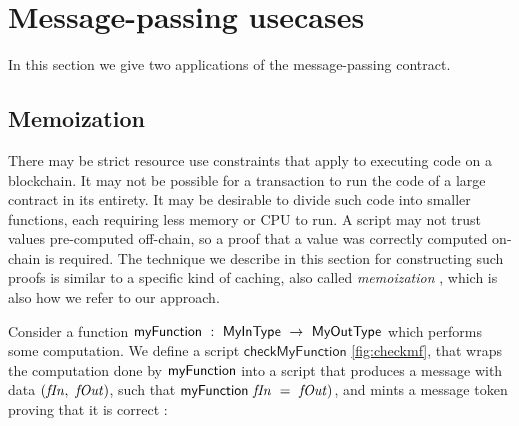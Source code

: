 
\section{Message-passing usecases}
\label{sec:usecases}

In this section we give two applications of the message-passing contract.

\subsection{Memoization}
\label{sec:partial}

There may be strict resource use constraints that apply to executing code on a
blockchain. It may not be possible for a transaction to run the code of a large contract in its
entirety. It may be desirable to divide such code into smaller functions, each requiring
less memory or CPU to run. A script may not trust values pre-computed off-chain,
so a proof that a value was correctly computed on-chain is required.
The technique we describe in this section for constructing such proofs is
similar to a specific kind of caching, also called \emph{memoization} \cite{memoization},
which is also how we refer to our approach.

Consider a function $\mathsf{myFunction}~:~\mathsf{MyInType}~\to~ \mathsf{MyOutType}$
which performs some computation. We define a script $\mathsf{checkMyFunction}$ \ref{fig:checkmf},
that wraps the computation
done by $\mathsf{myFunction}$ into a script that produces a message with
data $(\mathit{fIn},~\mathit{fOut})$, such that $\mathsf{myFunction}~\mathit{fIn}~=~\mathit{fOut})$,
and mints a message token proving that it is correct :

